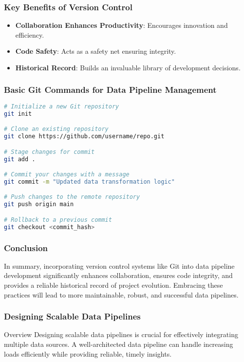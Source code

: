 \documentclass{beamer}
\begin{document}
\begin{frame}[fragile]
    \frametitle{Key Benefits of Version Control}
    \begin{itemize}
        \item \textbf{Collaboration Enhances Productivity}: Encourages innovation and efficiency.
        \item \textbf{Code Safety}: Acts as a safety net ensuring integrity.
        \item \textbf{Historical Record}: Builds an invaluable library of development decisions.
    \end{itemize}
\end{frame}

\begin{frame}[fragile]
    \frametitle{Basic Git Commands for Data Pipeline Management}
    \begin{lstlisting}[language=bash]
# Initialize a new Git repository
git init

# Clone an existing repository
git clone https://github.com/username/repo.git

# Stage changes for commit
git add .

# Commit your changes with a message
git commit -m "Updated data transformation logic"

# Push changes to the remote repository
git push origin main

# Rollback to a previous commit
git checkout <commit_hash>
    \end{lstlisting}
\end{frame}

\begin{frame}
    \frametitle{Conclusion}
    In summary, incorporating version control systems like Git into data pipeline development significantly enhances collaboration, ensures code integrity, 
    and provides a reliable historical record of project evolution. Embracing these practices will lead to more maintainable, robust, and successful data pipelines.
\end{frame}

\begin{frame}[fragile]
    \frametitle{Designing Scalable Data Pipelines}
    \begin{block}{Overview}
        Designing scalable data pipelines is crucial for effectively integrating multiple data sources. A well-architected data pipeline can handle increasing loads efficiently while providing reliable, timely insights.
    \end{block}
\end{frame}
\end{document}
